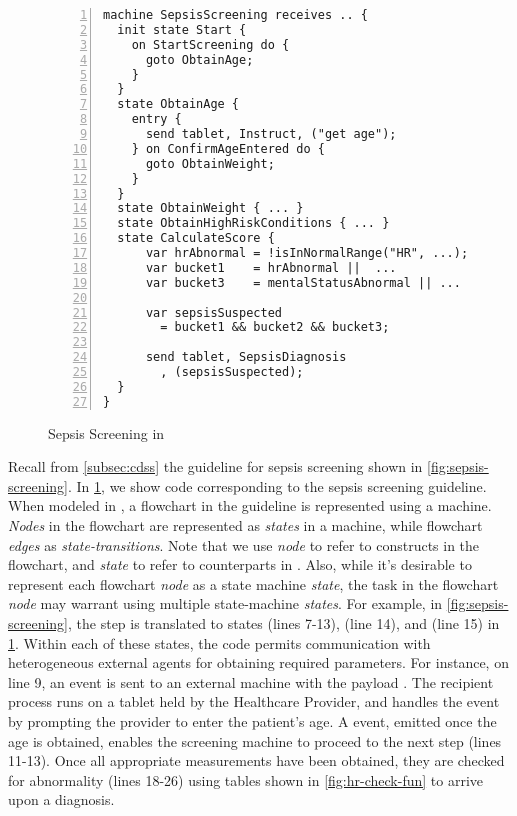 \begin{figure}[H]
  \begin{lstlisting}[style=mediksty, language=medik,  multicols=2,
  basicstyle=\ttfamily\tiny, numbers=left
  ,showspaces=false
  ,xleftmargin=2em]
machine SepsisScreening receives .. {
  init state Start {
    on StartScreening do {
      goto ObtainAge;
    }
  }
  state ObtainAge {
    entry {
      send tablet, Instruct, ("get age");
    } on ConfirmAgeEntered do {
      goto ObtainWeight;
    }
  }
  state ObtainWeight { ... }
  state ObtainHighRiskConditions { ... }
  state CalculateScore {
      var hrAbnormal = !isInNormalRange("HR", ...);
      var bucket1    = hrAbnormal ||  ...
      var bucket3    = mentalStatusAbnormal || ...

      var sepsisSuspected
        = bucket1 && bucket2 && bucket3;

      send tablet, SepsisDiagnosis
        , (sepsisSuspected);
  }
}
\end{lstlisting}
  \caption{Sepsis Screening in \MediK{}}\label{fig:medik-sepsis-screening}
\end{figure}

Recall from \ref{subsec:cdss} the guideline for sepsis screening shown in
\figurename{} \ref{fig:sepsis-screening}.
In \figurename{} \ref{fig:medik-sepsis-screening}, we show
\MediK{} code corresponding to the sepsis screening guideline.
When modeled in \MediK{}, a flowchart in the guideline is represented using
a \MediK{} machine. \emph{Nodes} in the flowchart are represented as
\emph{states} in a \MediK{} machine, while flowchart \emph{edges} as \emph{state-transitions}.
Note that we use \emph{node} to refer to constructs
in the flowchart, and \emph{state} to refer to counterparts in \MediK{}.
Also, while it's desirable to represent each flowchart \emph{node} as a
state machine \emph{state}, the task in the flowchart \emph{node} may warrant using
multiple state-machine \emph{states}. For example,
in \figurename{} \ref{fig:sepsis-screening}, the step  is translated to states  (lines
7-13),  (line 14), and
 (line 15) in \figurename{} \ref{fig:medik-sepsis-screening}.
Within each of these states, the code
permits communication with heterogeneous external agents for obtaining
required parameters. For instance, on line 9, an
 event is sent to an external  machine
with the payload . The recipient process
runs on a tablet held by the Healthcare Provider, and handles
the event by prompting the provider to enter the patient's age.
A  event, emitted once the age
is obtained, enables the screening machine to proceed to the next
step (lines 11-13). Once all appropriate measurements have been obtained,
they are checked for abnormality (lines 18-26) using tables shown in \figurename{}
\ref{fig:hr-check-fun} to arrive upon a diagnosis.


